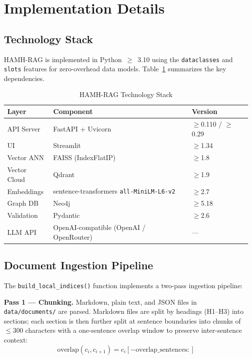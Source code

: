 \documentclass[conference]{IEEEtran}
\begin{document}
\section{Implementation Details}
\label{sec:impl}

\subsection{Technology Stack}

HAMH-RAG is implemented in Python~$\geq$~3.10 using the
\texttt{dataclasses} and \texttt{slots} features for zero-overhead
data models.  Table~\ref{tab:stack} summarizes the key dependencies.

\begin{table}[!t]
\renewcommand{\arraystretch}{1.2}
\caption{HAMH-RAG Technology Stack}
\label{tab:stack}
\centering
\begin{tabular}{@{}lll@{}}
\toprule
\textbf{Layer} & \textbf{Component} & \textbf{Version} \\
\midrule
API Server   & FastAPI + Uvicorn  & $\geq$0.110 / $\geq$0.29 \\
UI           & Streamlit          & $\geq$1.34 \\
Vector ANN   & FAISS (IndexFlatIP)& $\geq$1.8 \\
Vector Cloud & Qdrant             & $\geq$1.9 \\
Embeddings   & sentence-transformers \texttt{all-MiniLM-L6-v2} & $\geq$2.7 \\
Graph DB     & Neo4j              & $\geq$5.18 \\
Validation   & Pydantic           & $\geq$2.6 \\
LLM API      & OpenAI-compatible (OpenAI / OpenRouter) & — \\
\bottomrule
\end{tabular}
\end{table}

\subsection{Document Ingestion Pipeline}

The \texttt{build\_local\_indices()} function implements a
two-pass ingestion pipeline:

\textbf{Pass 1 — Chunking.}  Markdown, plain text, and JSON files
in \texttt{data/documents/} are parsed.  Markdown files are split
by headings (H1–H3) into sections; each section is then further split
at sentence boundaries into chunks of $\leq 300$ characters with a
one-sentence overlap window to preserve inter-sentence context:
\begin{equation}
  \text{overlap}(c_i, c_{i+1}) = c_i[-\text{overlap\_sentences}:]
  \label{eq:overlap}
\end{equation}
\end{document}
